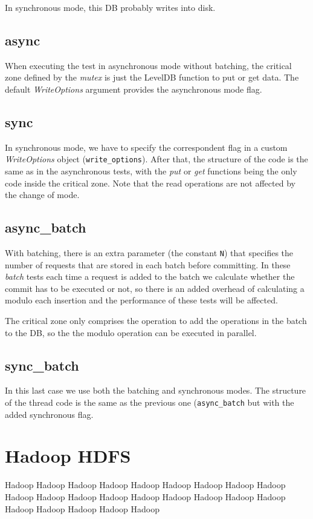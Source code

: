 \documentclass[11pt]{article}
\begin{document}
In synchronous mode, this DB probably writes into disk.

\subsection{async}
When executing the test in asynchronous mode without batching, the critical zone defined by the \textit{mutex} is just the LevelDB function to put or get data. The default \textit{WriteOptions} argument provides the asynchronous mode flag.

\subsection{sync}
In synchronous mode, we have to specify the correspondent flag in a custom \textit{WriteOptions} object (\texttt{write\_options}). After that, the structure of the code is the same as in the asynchronous tests, with the \textit{put} or \textit{get} functions being the only code inside the critical zone. Note that the read operations are not affected by the change of mode.

\subsection{async\_batch}
With batching, there is an extra parameter (the constant \texttt{N}) that specifies the number of requests that are stored in each batch before committing. In these \textit{batch} tests each time a request is added to the batch we calculate whether the commit has to be executed or not, so there is an added overhead of calculating a modulo each insertion and the performance of these tests will be affected.

The critical zone only comprises the operation to add the operations in the batch to the DB, so the the modulo operation can be executed in parallel.

\subsection{sync\_batch}
In this last case we use both the batching and synchronous modes. The structure of the thread code is the same as the previous one (\texttt{async\_batch} but with the added synchronous flag.


\section{Hadoop HDFS}
Hadoop Hadoop Hadoop Hadoop Hadoop Hadoop
Hadoop Hadoop Hadoop Hadoop Hadoop Hadoop 
Hadoop Hadoop Hadoop Hadoop Hadoop Hadoop 
Hadoop Hadoop Hadoop Hadoop Hadoop 
\end{document}
